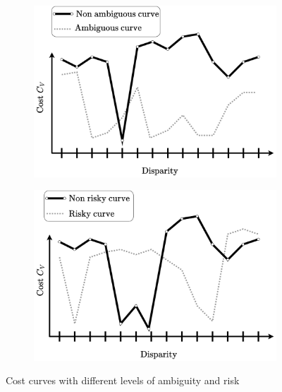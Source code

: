 \begin{figure}
    \centering
    \begin{subfigure}[t]{0.5\linewidth}
        \centering
        \includegraphics[width=\linewidth]{Images/Chap_1/Ambiguity.png}
        \caption{}
        \label{fig:ambgiuity}
    \end{subfigure}\hfill
    \begin{subfigure}[t]{0.5\linewidth}
        \centering
        \includegraphics[width=\linewidth]{Images/Chap_1/Risk.png}
        \caption{}
        \label{fig:risk}
    \end{subfigure}\hfill
    \caption{Cost curves with different levels of ambiguity  and risk }
    \label{fig:ambiguity_risk}
\end{figure}

